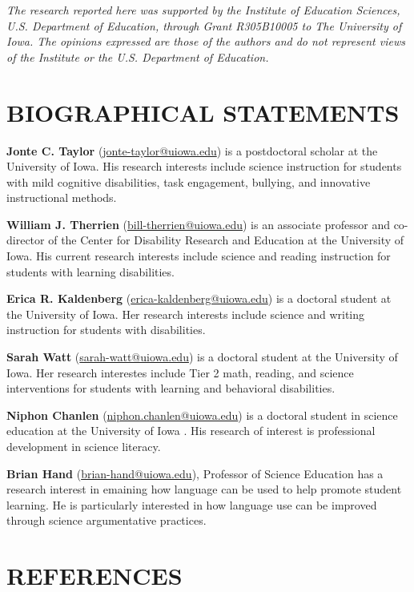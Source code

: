 \documentclass[11.5pt]{sig-alternate} %
\begin{document}
\begin{large}
\textit{The research reported here was supported by the Institute of Education Sciences, U.S. Department of Education, through Grant R305B10005 to The University of Iowa. The opinions expressed are those of the authors and do not represent views of the Institute or the U.S. Department of Education.}

\section*{BIOGRAPHICAL STATEMENTS}
\textbf{Jonte C. Taylor} (\href{mailto:jonte-taylor@uiowa.edu}{jonte-taylor@uiowa.edu}) is a postdoctoral scholar at the University of Iowa. His research interests include science instruction for students with mild cognitive disabilities, task engagement, bullying, and innovative instructional methods.

\textbf{William J. Therrien} (\href{mailto:bill-therrien@uiowa.edu}{bill-therrien@uiowa.edu}) is an associate professor and co-director of the Center for Disability Research and Education at the University of Iowa. His current research interests include science and reading instruction for students with learning disabilities.

\textbf{Erica R. Kaldenberg} (\href{mailto:erica-kaldenberg@uiowa.edu}{erica-kaldenberg@uiowa.edu}) is a doctoral student at the University of Iowa. Her research interests include science and writing instruction for students with disabilities.

\textbf{Sarah Watt} (\href{mailto:sarah-watt@uiowa.edu}{sarah-watt@uiowa.edu}) is a doctoral student at the University of Iowa. Her research interestes include Tier 2 math, reading, and science interventions for students with learning and behavioral disabilities.

\textbf{Niphon Chanlen} (\href{mailto:niphon.chanlen@uiowa.edu}{niphon.chanlen@uiowa.edu}) is a doctoral student in science education at the University of Iowa . His research of interest is professional development in science literacy.

\textbf{Brian Hand} (\href{mailto:brian-hand@uiowa.edu}{brian-hand@uiowa.edu}), Professor of Science Education has a research interest in emaining how language can be used to help promote student learning. He is particularly interested in how language use can be improved through science argumentative practices. 

\end{large}
\clearpage
\section*{REFERENCES}\par 
\end{document}
